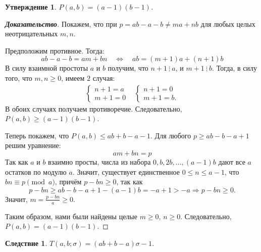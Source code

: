 \documentclass[12pt]{article}
\newtheorem{proposition}[theorem]{Утверждение}
\newtheorem{corollary}[theorem]{Следствие}
\begin{document}
\begin{proposition}
$P(a, b) = (a - 1)(b - 1)$.
\end{proposition}
\begin{proof}[\textbf{Доказательство}]
Покажем, что при $p = ab - a - b \ne ma + nb$ для любых целых неотрицательных $m, n$.

Предположим противное. Тогда: \begin{equation*}
 ab - a - b = am + bn \quad \Longleftrightarrow \quad ab = (m + 1)a + (n + 1) b
\end{equation*}
В силу взаимной простоты $a$ и $b$ получим, что $n + 1 \ \vdots \ a$, и $m + 1 \ \vdots \ b$. Тогда, в силу того, что $m, n \ge 0$, имеем $2$ случая:\begin{align*}
     \begin{cases}
        n + 1 = a\\
        m + 1 = 0
    \end{cases}
    &
    \begin{cases}
        n + 1 = 0\\
        m + 1 = b.
    \end{cases}
\end{align*}
В обоих случаях получаем противоречие. Следовательно, $P(a, b) \ge (a - 1)(b - 1)$.

Теперь покажем, что $P(a, b) \le ab + b - a - 1$. Для любого $p \ge ab - b - a + 1$ решим уравнение: \begin{equation*}
am + bn = p
\end{equation*}
Так как $a$ и $b$ взаимно просты, числа из набора $0, b, 2b, \dots, (a - 1)b$ дают все $a$ остатков по модулю $a$. Значит, существует единственное $0 \le n \le a - 1$, что $bn \equiv p \pmod a$, причём $p - bn \ge 0$, так как 
\begin{equation*}
p - bn \ge ab - b - a + 1 - (a - 1)b = -a + 1 > -a \Longrightarrow p - bn \ge 0.
\end{equation*}
Значит, $m = \frac{p - bn}{a} \ge 0$.

Таким образом, нами были найдены целые $m \ge 0$, $n \ge 0$. Следовательно, $P(a, b) = (a - 1)(b - 1)$.
\end{proof}
\begin{corollary}
$T(a, b; \sigma) = (ab + b - a)\sigma - 1$.
\end{corollary}
\end{document}
